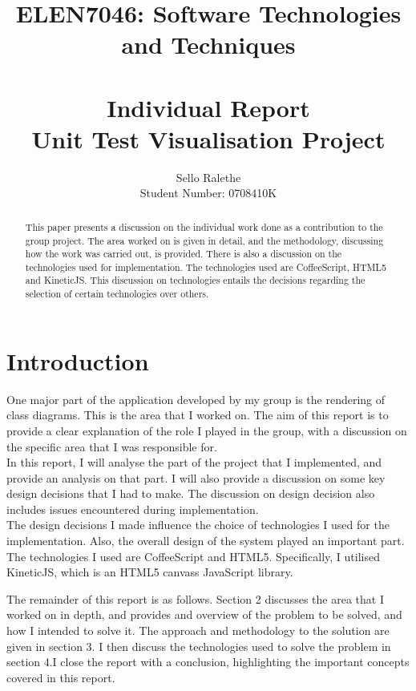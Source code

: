 \documentclass[titlepage,a4paper,11pt]{report}
\title{ELEN7046: Software Technologies and Techniques\\\ \\ Individual Report\\ Unit Test Visualisation Project }
\author {Sello Ralethe\\ Student Number: 0708410K}
\begin{document}
\maketitle


\setcounter{page}{1}
\renewcommand{\thepage}{\arabic{page}}


\begin{abstract}
This paper presents a discussion on the individual work done as a contribution to the group project. The area worked on is given in detail, and the methodology, discussing how the work was carried out, is provided. There is also a discussion on the technologies used for implementation. The technologies used are CoffeeScript, HTML5 and KineticJS. This discussion on technologies entails the decisions regarding the selection of certain technologies over others. 
\end{abstract}

\clearpage
{}
\tableofcontents
\listoffigures
\clearpage
\renewcommand*\thesection{\arabic{section}}

\section{Introduction}
One major part of the application developed by my group is the rendering of class diagrams. This is the area that I worked on. The aim of this report is to provide a clear explanation of the role I played in the group, with a discussion on the specific area that I was responsible for. \\

\indent In this report, I will analyse the part of the project that I implemented, and provide an analysis on that part. I will also provide a discussion on some key design decisions that I had to make. The discussion on design decision also includes issues encountered during implementation.\\

\indent The design decisions I made influence the choice of technologies I used for the implementation. Also, the overall design of the system played an important part. The technologies I used are CoffeeScript and HTML5. Specifically, I utilised KineticJS, which is an HTML5 canvass JavaScript library.

The remainder of this report is as follows. Section 2 discusses the area that I worked on in depth, and provides and overview of the problem to be solved, and how I intended to solve it. The approach and methodology to the solution are given in section 3. I then discuss the technologies used to solve the problem in section 4.I close the report with a conclusion, highlighting the important concepts covered in this report. 
\end{document}
